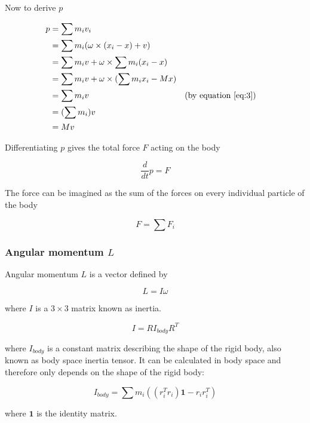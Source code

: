 \documentclass[12pt,a4paper,twoside,openright]{report}
\begin{document}
Now to derive $p$

\begin{align*} 
    p &= \sum m_i v_i \\
      &= \sum m_i (\omega \times (x_i - x) + v) \\
      &= \sum m_i v + \omega \times \sum m_i (x_i - x) \\
      &= \sum m_i v + \omega \times (\sum m_i x_i - M x) \\
      &= \sum m_i v && \text{(by equation \eqref{eq:3})} \\
      &= (\sum m_i) v \\
      &= M v
\end{align*} 

Differentiating $p$ gives the total force $F$ acting on the body

\begin{equation}
\frac{d}{dt} p = F
\end{equation}

The force can be imagined as the sum of the forces on every individual particle of the body

\begin{equation}
F = \sum F_i
\end{equation}

\subsubsection{Angular momentum $L$} 

Angular momentum $L$ is a vector defined by

\begin{equation}
L = I \omega
\end{equation}

where $I$ is a $3\times 3$ matrix known as inertia.

\begin{equation}
I = R I_{body} R^T
\end{equation}

where $I_{body}$ is a constant matrix describing the shape of the rigid body, also known as body space inertia tensor. It can be calculated in body space and therefore only depends on the shape of the rigid body:\label{ineref}
    
\begin{equation}
I_{body} = \sum m_i((r_i^T r_i)\textbf{1} - r_i r_i^T)
\end{equation}

where $\textbf{1}$ is the identity matrix.
\end{document}
